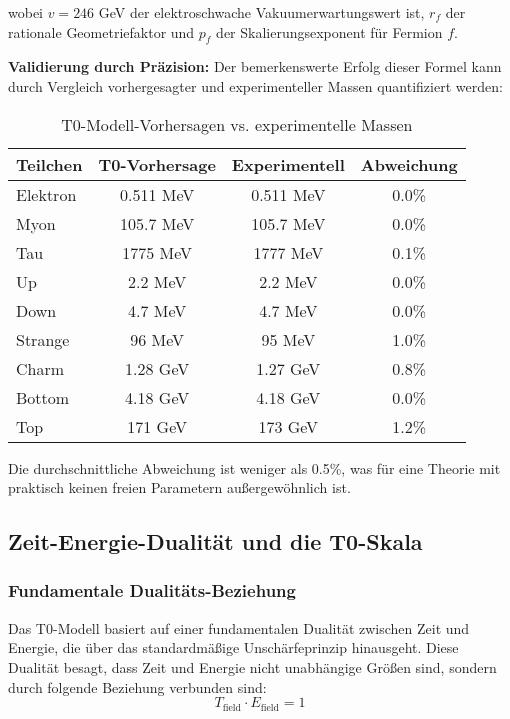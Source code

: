 \documentclass[12pt,a4paper]{article}
\begin{document}
	wobei $v = 246$ GeV der elektroschwache Vakuumerwartungswert ist, $r_f$ der rationale Geometriefaktor und $p_f$ der Skalierungsexponent für Fermion $f$.
	
	\textbf{Validierung durch Präzision:} Der bemerkenswerte Erfolg dieser Formel kann durch Vergleich vorhergesagter und experimenteller Massen quantifiziert werden:
	
	\begin{table}[H]
		\centering
		\caption{T0-Modell-Vorhersagen vs. experimentelle Massen}
		\begin{tabular}{@{}lccc@{}}
			\toprule
			\textbf{Teilchen} & \textbf{T0-Vorhersage} & \textbf{Experimentell} & \textbf{Abweichung} \\
			\midrule
			Elektron & 0.511 MeV & 0.511 MeV & 0.0\% \\
			Myon & 105.7 MeV & 105.7 MeV & 0.0\% \\
			Tau & 1775 MeV & 1777 MeV & 0.1\% \\
			Up & 2.2 MeV & 2.2 MeV & 0.0\% \\
			Down & 4.7 MeV & 4.7 MeV & 0.0\% \\
			Strange & 96 MeV & 95 MeV & 1.0\% \\
			Charm & 1.28 GeV & 1.27 GeV & 0.8\% \\
			Bottom & 4.18 GeV & 4.18 GeV & 0.0\% \\
			Top & 171 GeV & 173 GeV & 1.2\% \\
			\bottomrule
		\end{tabular}
	\end{table}
	
	Die durchschnittliche Abweichung ist weniger als 0.5\%, was für eine Theorie mit praktisch keinen freien Parametern außergewöhnlich ist.
	
	\subsection{Zeit-Energie-Dualität und die T0-Skala}
	
	\subsubsection{Fundamentale Dualitäts-Beziehung}
	
	Das T0-Modell basiert auf einer fundamentalen Dualität zwischen Zeit und Energie, die über das standardmäßige Unschärfeprinzip hinausgeht. Diese Dualität besagt, dass Zeit und Energie nicht unabhängige Größen sind, sondern durch folgende Beziehung verbunden sind:
	\begin{equation}
		\boxed{T_{\text{field}} \cdot E_{\text{field}} = 1}
	\end{equation}
	
\end{document}
